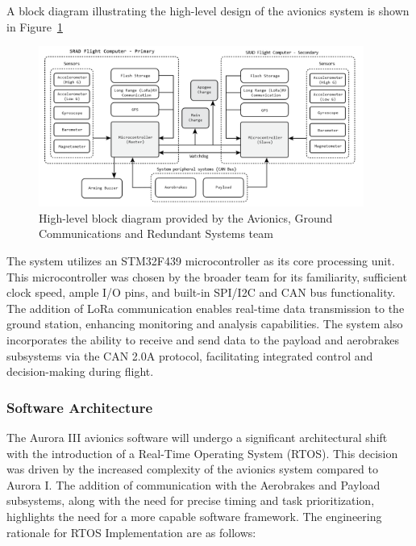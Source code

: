 A block diagram illustrating the high-level design of the avionics system is shown in Figure~\ref{fig:avionics-block}

\begin{figure}[h]
  \begin{center}
    \includegraphics[width=0.95\textwidth]{./img/Section_4_1_A3_SRAD_design.jpg}
  \end{center}
  \caption{High-level block diagram provided by the Avionics, Ground Communications and Redundant Systems team}\label{fig:avionics-block}
\end{figure}


The system utilizes an STM32F439 microcontroller as its core processing unit. This microcontroller was chosen by the broader team for its familiarity, sufficient clock speed, ample I/O pins, and built-in SPI/I2C and CAN bus functionality. The addition of LoRa communication enables real-time data transmission to the ground station, enhancing monitoring and analysis capabilities. The system also incorporates the ability to receive and send data to the payload and aerobrakes subsystems via the CAN 2.0A protocol, facilitating integrated control and decision-making during flight. 

\subsubsection{Software Architecture}
The Aurora III avionics software will undergo a significant architectural shift with the introduction of a Real-Time Operating System (RTOS). This decision was driven by the increased complexity of the avionics system compared to Aurora I. The addition of communication with the Aerobrakes and Payload subsystems, along with the need for precise timing and task prioritization, highlights the need for a more capable software framework. The engineering rationale for RTOS Implementation are as follows:  

